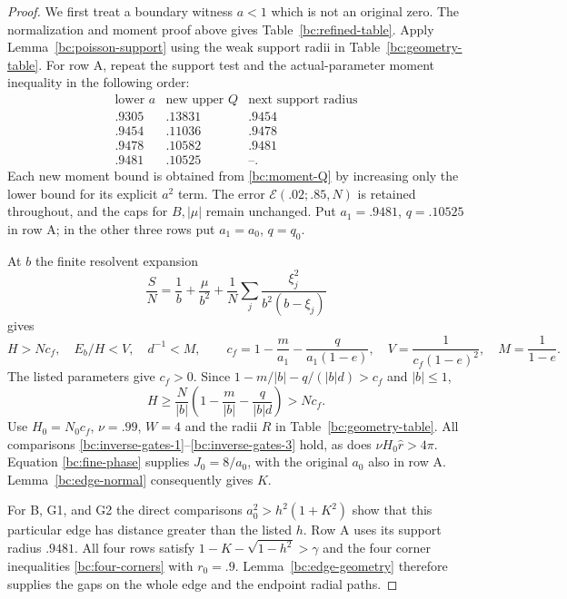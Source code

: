 \documentclass[11pt,reqno]{amsart}
\numberwithin{equation}{section}
\theoremstyle{definition}
\theoremstyle{remark}
\begin{document}
\begin{proof}
We first treat a boundary witness $a<1$ which is not an original
zero.  The normalization and moment proof above gives
Table~\ref{bc:refined-table}.  Apply Lemma~\ref{bc:poisson-support}
using the weak support radii in Table~\ref{bc:geometry-table}.
For row A, repeat the support test and the actual-parameter moment
inequality in the following order:
\begin{equation}\label{bc:feedback}
\begin{array}{c|c|c}
 \text{lower }a&\text{new upper }Q&\text{next support radius}\\ \hline
 .9305&.13831&.9454\\
 .9454&.11036&.9478\\
 .9478&.10582&.9481\\
 .9481&.10525&\text{--}.
\end{array}
\end{equation}
Each new moment bound is obtained from \eqref{bc:moment-Q} by
increasing only the lower bound for its explicit $a^2$ term.
The error $\mathcal E(.02;.85,N)$ is retained throughout, and the
caps for $B,|\mu|$ remain unchanged.
Put $a_1=.9481$, $q=.10525$ in row A;
in the other three rows put $a_1=a_0$, $q=q_0$.

At $b$ the finite resolvent expansion
\[
 \frac SN=\frac1b+\frac{\mu}{b^2}
                  +\frac1N\sum_j\frac{\xi_j^2}{b^2(b-\xi_j)}
\]
gives
\begin{equation}\label{bc:moment-field}
 H>Nc_f,\quad E_b/H<V,\quad d^{-1}<M,\qquad
 c_f=1-\frac m{a_1}-\frac q{a_1(1-e)},\quad
 V=\frac1{c_f(1-e)^2},\quad M=\frac1{1-e}.
\end{equation}
The listed parameters give $c_f>0$.  Since
$1-m/|b|-q/(|b|d)>c_f$ and $|b|\leq1$,
\[
 H\geq\frac N{|b|}\left(1-\frac m{|b|}-\frac q{|b|d}\right)>Nc_f.
\]
Use $H_0=N_0c_f$, $\nu=.99$, $W=4$ and the radii $R$ in
Table~\ref{bc:geometry-table}.  All comparisons
\eqref{bc:inverse-gates-1}--\eqref{bc:inverse-gates-3} hold, as does
$\nu H_0\widehat r>4\pi$.  Equation \eqref{bc:fine-phase} supplies
$J_0=8/a_0$, with the original $a_0$ also in row A.
Lemma~\ref{bc:edge-normal} consequently gives $K$.

For B, G1, and G2 the direct comparisons
$a_0^2>h^2(1+K^2)$ show that this particular edge has distance
greater than the listed $h$.  Row A uses its support radius $.9481$.
All four rows satisfy
$1-K-\sqrt{1-h^2}>\gamma$ and the four corner inequalities
\eqref{bc:four-corners} with $r_0=.9$.
Lemma~\ref{bc:edge-geometry} therefore supplies the gaps on the
whole edge and the endpoint radial paths.


\end{proof}
\end{document}
